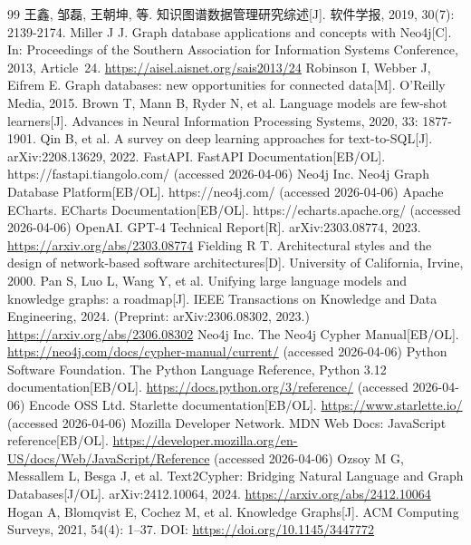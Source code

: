 \documentclass[12pt,a4paper]{article}
\begin{document}
\thesisbibliographyheading
\begin{thebibliography}{99}%
	王鑫, 邹磊, 王朝坤, 等. 知识图谱数据管理研究综述[J]. 软件学报, 2019, 30(7): 2139-2174.
	Miller J J. Graph database applications and concepts with Neo4j[C]. In: Proceedings of the Southern Association for Information Systems Conference, 2013, Article~24. \url{https://aisel.aisnet.org/sais2013/24}
	Robinson I, Webber J, Eifrem E. Graph databases: new opportunities for connected data[M]. O'Reilly Media, 2015.
	Brown T, Mann B, Ryder N, et al. Language models are few-shot learners[J]. Advances in Neural Information Processing Systems, 2020, 33: 1877-1901.
	Qin B, et al. A survey on deep learning approaches for text-to-SQL[J]. arXiv:2208.13629, 2022.
	FastAPI. FastAPI Documentation[EB/OL]. https://fastapi.tiangolo.com/ (accessed 2026-04-06)
	Neo4j Inc. Neo4j Graph Database Platform[EB/OL]. https://neo4j.com/ (accessed 2026-04-06)
	Apache ECharts. ECharts Documentation[EB/OL]. https://echarts.apache.org/ (accessed 2026-04-06)
	OpenAI. GPT-4 Technical Report[R]. arXiv:2303.08774, 2023. \url{https://arxiv.org/abs/2303.08774}
	Fielding R T. Architectural styles and the design of network-based software architectures[D]. University of California, Irvine, 2000.
	Pan S, Luo L, Wang Y, et al. Unifying large language models and knowledge graphs: a roadmap[J]. IEEE Transactions on Knowledge and Data Engineering, 2024. (Preprint: arXiv:2306.08302, 2023.) \url{https://arxiv.org/abs/2306.08302}
	Neo4j Inc. The Neo4j Cypher Manual[EB/OL]. \url{https://neo4j.com/docs/cypher-manual/current/} (accessed 2026-04-06)
	Python Software Foundation. The Python Language Reference, Python 3.12 documentation[EB/OL]. \url{https://docs.python.org/3/reference/} (accessed 2026-04-06)
	Encode OSS Ltd. Starlette documentation[EB/OL]. \url{https://www.starlette.io/} (accessed 2026-04-06)
	Mozilla Developer Network. MDN Web Docs: JavaScript reference[EB/OL]. \url{https://developer.mozilla.org/en-US/docs/Web/JavaScript/Reference} (accessed 2026-04-06)
	Ozsoy M G, Messallem L, Besga J, et al. Text2Cypher: Bridging Natural Language and Graph Databases[J/OL]. arXiv:2412.10064, 2024. \url{https://arxiv.org/abs/2412.10064}
	Hogan A, Blomqvist E, Cochez M, et al. Knowledge Graphs[J]. ACM Computing Surveys, 2021, 54(4): 1--37. DOI: \url{https://doi.org/10.1145/3447772}
\end{thebibliography}
\end{document}
